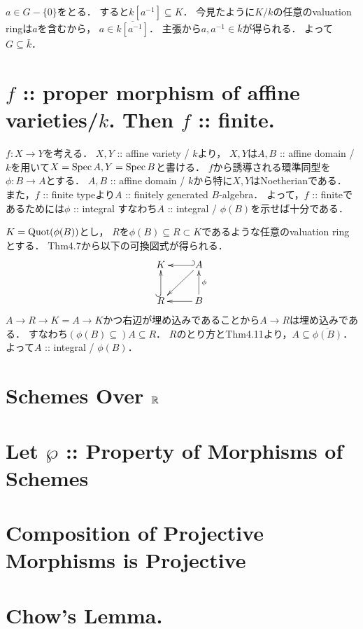 \documentclass[a4paper]{jsarticle}
\begin{document}
    $a \in G-\{0\}$をとる．
    すると$k[a^{-1}] \subseteq K$．
    今見たように$K/k$の任意のvaluation ringは$a$を含むから，
    $a \in \overline{k[a^{-1}]}$．
    主張から$a, a^{-1} \in \bar{k}$が得られる．
    よって$G \subseteq \bar{k}$．

\section{$f$ :: proper morphism of affine varieties/$k$. Then $f$ :: finite.} %
    $f: X \to Y$を考える．
    $X,Y$ :: affine variety / $k$より，
    $X,Y$は$A, B$ :: affine domain / $k$を用いて$X=\operatorname{Spec} A, Y=\operatorname{Spec} B$と書ける．
    $f$から誘導される環準同型を$\phi: B \to A$とする．
    $A, B$ :: affine domain / $k$から特に$X, Y$はNoetherianである．
    また，$f$ :: finite typeより$A$ :: finitely generated $B$-algebra．
    よって，$f$ :: finiteであるためには$\phi$ :: integral
    すなわち$A$ :: integral / $\phi(B)$を示せば十分である．

    $K=\operatorname{Quot}(\phi(B))$とし，
    $R$を$\phi(B) \subseteq R \subset K$であるような任意のvaluation ringとする．
    Thm4.7から以下の可換図式が得られる．
    \[
    \xymatrix
    {
        K  & A \ar@{_{(}->}[l] \ar[ld]\\
        R  \ar@{^{(}->}[u]& B \ar[u]_-{\phi} \ar[l]
    }
    \]
    $A \to R \to K=A \to K$かつ右辺が埋め込みであることから$A \to R$は埋め込みである．
    すなわち$(\phi(B) \subseteq )A \subseteq R$．
    $R$のとり方とThm4.11より，$A \subseteq \overline{\phi(B)}$．
    よって$A$ :: integral / $\phi(B)$．

\section{Schemes Over $\mathbb{R}$} %

\section{Let $\wp$ :: Property of Morphisms of Schemes} %

\section{Composition of Projective Morphisms is Projective} %

\section{Chow's Lemma.} %
\end{document}
